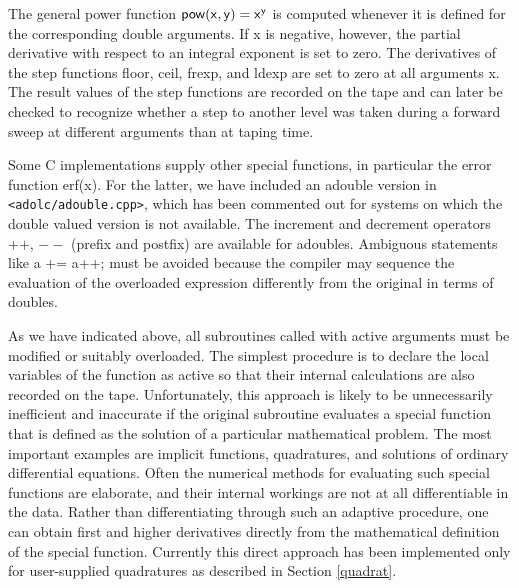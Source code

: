 \documentclass[11pt,twoside]{article}
\begin{document}
The general power function ${\sf pow(x,y)=x^y}$ is computed whenever
it is defined for the corresponding {\sf double} arguments. If {\sf x} is
negative, however, the partial derivative with respect to an integral exponent
is set to zero. 
The derivatives of the step functions 
{\sf floor}, {\sf ceil}, {\sf frexp}, and {\sf ldexp} are set to zero at all
arguments {\sf x}. The result values of the step functions 
are recorded on the tape and can later be checked to recognize 
whether a step to another level was taken during a forward sweep 
at different arguments than at taping time.

Some C implementations supply other special
functions, in particular the error function {\sf erf(x)}. For the
latter, we have included an {\sf adouble} version in \verb=<adolc/adouble.cpp>=, which
has been commented out for systems on which the {\sf double} valued version
is not available. The increment and decrement operators {\sf ++}, \boldmath $--$ \unboldmath (prefix and
postfix) are available for {\sf adouble}s.
%
%
Ambiguous statements like {\sf a += a++;} must be 
avoided because the compiler may sequence the evaluation of the
overloaded
expression differently from the original in terms of {\sf double}s.

As we have indicated above, all subroutines called with active arguments
must be modified or suitably overloaded. The simplest procedure is
to declare the local variables of the function as active so that
their internal calculations are also recorded on the tape.
Unfortunately, this approach is likely to be unnecessarily inefficient
and inaccurate if the original subroutine evaluates a special function
that is defined as the solution of a particular mathematical problem.
The most important examples are implicit functions, quadratures,
and solutions of ordinary differential equations. Often
the numerical methods for evaluating such special functions are
elaborate, and their internal workings are not at all differentiable in
the data. Rather than differentiating through such an adaptive
procedure, one can obtain first and higher derivatives directly from
the mathematical definition of the special function. Currently this
direct approach has been implemented only for user-supplied quadratures
as described in Section \ref{quadrat}.
%
\end{document}
